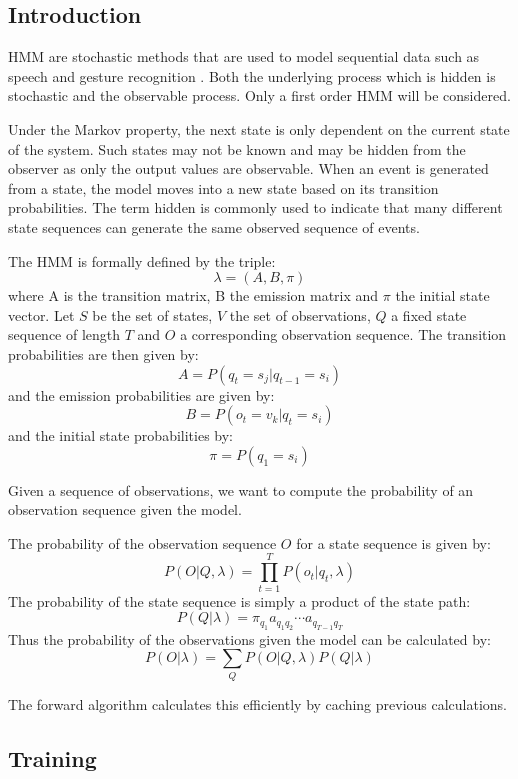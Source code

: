 \subsection{Introduction}



\ac{HMM} are stochastic methods that are used to model sequential data such as speech and gesture recognition \cite{Rabiner1989}. Both the underlying process which is hidden is stochastic and the observable process. Only a first order \ac{HMM} will be considered.

Under the Markov property, the next state is only dependent on the current state of the system. Such states may not be known and may be hidden from the observer as only the output values are observable. When an event is generated from a state, the model moves into a new state based on its transition probabilities. The term hidden is commonly used to indicate that many different state sequences can generate the same observed sequence of events.

The \ac{HMM} is formally defined by the triple:
\[\lambda = (A,B,\pi) \]
where A is the transition matrix, B the emission matrix and $\pi$ the initial state vector. Let $S$ be the set of states, $V$ the set of observations, $Q$ a fixed state sequence of length $T$ and $O$ a corresponding observation sequence.
The transition probabilities are then given by:
\[ A = P(q_t = s_j | q_{t-1} = s_i) \]
and the emission probabilities are given by:
\[ B = P(o_t = v_k | q_t = s_i) \]
and the initial state probabilities by:
\[ \pi = P(q_1 = s_i) \]

Given a sequence of observations, we want to compute the probability of an observation sequence given the model.

The probability of the observation sequence $O$ for a state sequence is given by:
\[ P(O|Q,\lambda) = \prod^T_{t=1} P(o_t | q_t,\lambda) \]
The probability of the state sequence is simply a product of the state path:
\[ P(Q|\lambda)= \pi_{q_1}a_{q_1 q_2} \cdots a_{q_{T-1} q_T} \]
Thus the probability of the observations given the model can be calculated by:
\[ P(O|\lambda) = \sum_Q P(O|Q,\lambda) P(Q|\lambda) \]

The forward algorithm calculates this efficiently by caching previous calculations.

\subsection{Training}

